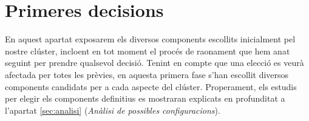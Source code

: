 \section{Primeres decisions}

En aquest apartat exposarem els diversos components escollits inicialment pel nostre clúster, incloent en tot moment el procés de raonament que hem anat seguint per prendre qualsevol decisió. 
Tenint en compte que una elecció es veurà afectada per totes les prèvies, en aquesta primera fase s'han escollit diversos components candidats per a cada aspecte del clúster. Properament, els estudis per elegir els components definitius es mostraran explicats en profunditat a l'apartat \ref{sec:analisi} (\textit{Anàlisi de possibles configuracions}).

\clearpage


\clearpage


\clearpage


\clearpage


\clearpage


